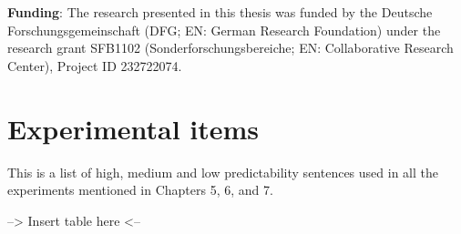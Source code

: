 \documentclass[a4paper, nobind]{templates/ociamthesis}
\newcommand*{\bibtitle}{Bibliography}
\begin{document}
\textbf{Funding}: The research presented in this thesis was funded by the Deutsche Forschungsgemeinschaft (DFG; EN: German Research Foundation) under the research grant SFB1102 (Sonderforschungsbereiche; EN: Collaborative Research Center), Project ID 232722074.

\startappendices

\hypertarget{experimental-items}{%
\chapter{Experimental items}\label{experimental-items}}

This is a list of high, medium and low predictability sentences used in all the experiments mentioned in Chapters 5, 6, and 7.

--\textgreater{} Insert table here \textless--


\setlength{\baselineskip}{0pt} %

{\renewcommand*\MakeUppercase[1]{#1}%
\printbibliography[heading=bibintoc,title={\bibtitle}]}
\end{document}
